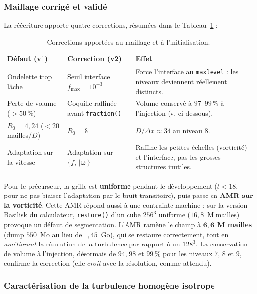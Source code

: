 \subsubsection{Maillage corrigé et validé}

La réécriture apporte quatre corrections, résumées dans le Tableau~\ref{tab:corrections_maillage} :

\begin{table}[H]
    \centering
    \caption{Corrections apportées au maillage et à l'initialisation.}
    \label{tab:corrections_maillage}
    \begin{tabular}{@{}p{4.2cm}p{4.2cm}p{6.3cm}@{}}
    \toprule
    \textbf{Défaut (v1)} & \textbf{Correction (v2)} & \textbf{Effet} \\ \midrule
    Ondelette trop lâche & Seuil interface $f_{\max}=10^{-3}$ & Force l'interface au
    \texttt{maxlevel} : les niveaux deviennent réellement distincts. \\
    Perte de volume ($>50\,\%$) & Coquille raffinée avant \texttt{fraction()} & Volume
    conservé à $97$--$99\,\%$ à l'injection (v. ci-dessous). \\
    $R_0 = 4{,}24$ ($<20$ mailles/$D$) & $R_0 = 8$ & $D/\Delta x \approx 34$ au niveau 8. \\
    Adaptation sur la vitesse & Adaptation sur $\{f,\,|\boldsymbol\omega|\}$ & Raffine les
    petites échelles (vorticité) et l'interface, pas les grosses structures inutiles. \\
    \bottomrule
    \end{tabular}
\end{table}

Pour le précurseur, la grille est \textbf{uniforme} pendant le développement
($t < 18$, pour ne pas biaiser l'adaptation par le bruit transitoire), puis passe en
\textbf{AMR sur la vorticité}. Cette AMR répond aussi à une contrainte machine : sur la
version Basilisk du calculateur, \texttt{restore()} d'un cube $256^3$ uniforme
($16{,}8$~M mailles) provoque un défaut de segmentation. L'AMR ramène le champ à
$\mathbf{6{,}6}$~\textbf{M mailles} (dump $550$~Mo au lieu de $1{,}45$~Go), qui se restaure
correctement, tout en \emph{améliorant} la résolution de la turbulence par rapport à un
$128^3$. La conservation de volume à l'injection, désormais de $94$, $98$ et $99\,\%$ pour
les niveaux $7$, $8$ et $9$, confirme la correction (elle \emph{croît} avec la résolution,
comme attendu).

\subsubsection{Caractérisation de la turbulence homogène isotrope}
\label{sec:carac_hit_ref}

